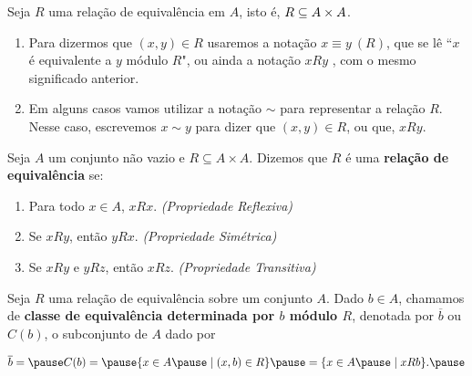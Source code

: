 \documentclass{beamer}
\begin{document}
    \begin{frame}
        \begin{observacoes}
            Seja $R$ uma rela{\c c}{\~a}o de equival{\^e}ncia em $A$, \pause isto \'e, $R \subseteq A \times A$.\pause
            \begin{enumerate}[label={\arabic*})]
                \item  Para dizermos que $(x, y) \in R$ \pause usaremos a nota{\c c}{\~a}o $x\equiv y\ (R)$, \pause que se l{\^e} ``$x$ \'e equivalente a $y$ m{\'o}dulo $R$", \pause ou ainda a nota{\c c}{\~a}o $xRy$ \pause, com o mesmo significado anterior.\pause
                \item Em alguns casos vamos utilizar a nota\c{c}\~ao $\sim$ \pause para representar a rela\c{c}\~ao $R$. \pause Nesse caso, escrevemos $x \sim y$ \pause para dizer que $(x, y) \in R$, \pause ou que, $xRy$.\pause
            \end{enumerate}
        \end{observacoes}

        \begin{definicao}
            Seja $A$ um conjunto n{\~a}o vazio \pause e $R\subseteq A \times A$. \pause Dizemos que $R$ {\'e} uma \textbf{rela{\c c}{\~a}o de equival{\^e}ncia} se:\pause
            \begin{enumerate}[label={\roman*})]
                \item Para todo $x \in A$, $xRx$. \textit{(Propriedade Reflexiva)}\pause
                \item Se $xRy$, ent\~ao $yRx$. \textit{(Propriedade Sim\'etrica)}\pause
                \item Se $xRy$ e $yRz$, ent\~ao $xRz$. \textit{(Propriedade Transitiva)}\pause
            \end{enumerate}
        \end{definicao}
    \end{frame}
    \begin{frame}
        \begin{definicao}
            Seja $R$ uma rela{\c c}{\~a}o de equival{\^e}ncia sobre um conjunto $A$. \pause Dado $b \in A$, \pause chamamos de \textbf{classe de equival{\^e}ncia \pause determinada por $b$ \pause m{\'o}dulo $R$}\pause, denotada por $\overline{b}$ \pause ou $C(b)$, \pause o subconjunto de $A$ \pause dado por\pause
            \begin{center}
                $\overline{b} =\pause C(b) = \pause \{x \in A \pause \mid (x,b) \in R\}\pause = \{x \in A \pause\mid xRb\}.\pause$
            \end{center}
        \end{definicao}
    \end{frame}
\end{document}
